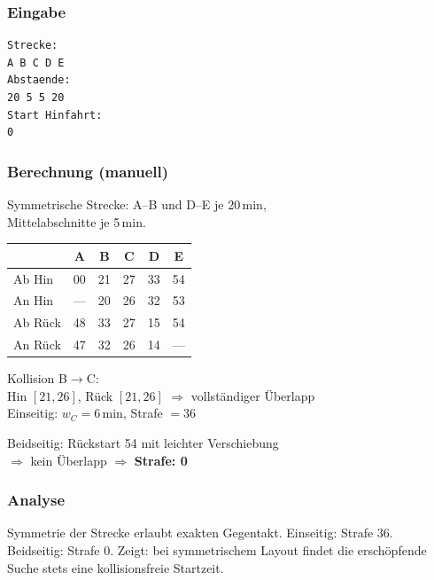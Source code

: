 \documentclass[12pt,a4paper]{article}
\begin{document}
\noindent
\begin{minipage}[t]{0.48\textwidth}
\scriptsize
\setlength{\tabcolsep}{2pt}

\subsubsection*{Eingabe}
\begin{lstlisting}
Strecke:
A B C D E
Abstaende:
20 5 5 20
Start Hinfahrt:
0
\end{lstlisting}

\subsubsection*{Berechnung (manuell)}
Symmetrische Strecke: A–B und D–E je 20\,min,\\
Mittelabschnitte je 5\,min.\\[2pt]
\begin{tabular}{l|ccccc}
\toprule
 & A & B & C & D & E\\
\midrule
Ab Hin  & 00 & 21 & 27 & 33 & 54\\
An Hin  & —  & 20 & 26 & 32 & 53\\
Ab Rück & 48 & 33 & 27 & 15 & 54\\
An Rück & 47 & 32 & 26 & 14 & —\\
\bottomrule
\end{tabular}

\vspace{4pt}
Kollision B$\to$C:\\
Hin $[21,26]$, Rück $[21,26]$ $\Rightarrow$ vollständiger Überlapp\\
Einseitig: $w_C = 6$\,min, Strafe $= 36$

\vspace{4pt}
Beidseitig: Rückstart 54 mit leichter Verschiebung\\
$\Rightarrow$ kein Überlapp $\Rightarrow$ \textbf{Strafe: 0}

\subsubsection*{Analyse}
Symmetrie der Strecke erlaubt exakten Gegentakt.
Einseitig: Strafe 36. Beidseitig: Strafe 0.
Zeigt: bei symmetrischem Layout findet die erschöpfende\\
Suche stets eine kollisionsfreie Startzeit.
\end{minipage}
\hfill
\end{document}
